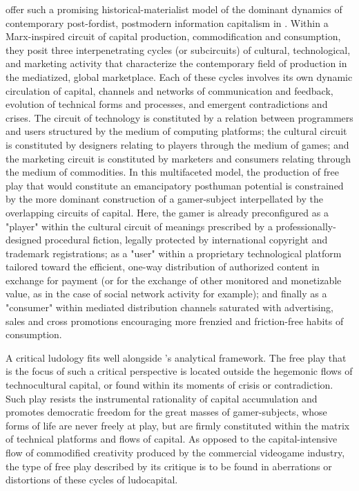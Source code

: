 \citeauthor{Kline2003} offer such a promising historical-materialist model of the dominant dynamics of contemporary post-fordist, postmodern information capitalism in . Within a Marx-inspired circuit of capital production, commodification and consumption, they posit three interpenetrating cycles (or subcircuits) of cultural, technological, and marketing activity that characterize the contemporary field of production in the mediatized, global marketplace. Each of these cycles involves its own dynamic circulation of capital, channels and networks of communication and feedback, evolution of technical forms and processes, and emergent contradictions and crises. The circuit of technology is constituted by a relation between programmers and users structured by the medium of computing platforms; the cultural circuit is constituted by designers relating to players through the medium of games; and the marketing circuit is constituted by marketers and consumers relating through the medium of commodities. In this multifaceted model, the production of free play that would constitute an emancipatory posthuman potential is constrained by the more dominant construction of a gamer-subject interpellated by the overlapping circuits of capital. Here, the gamer is already preconfigured as a "player" within the cultural circuit of meanings prescribed by a professionally-designed procedural fiction, legally protected by international copyright and trademark registrations; as a "user" within a proprietary technological platform tailored toward the efficient, one-way distribution of authorized content in exchange for payment (or for the exchange of other monitored and monetizable value, as in the case of social network activity for example); and finally as a "consumer" within mediated distribution channels saturated with advertising, sales and cross promotions encouraging more frenzied and friction-free habits of consumption.

A critical ludology fits well alongside \citeauthor{Kline2003}'s analytical framework. The free play that is the focus of such a critical perspective is located outside the hegemonic flows of technocultural capital, or found within its moments of crisis or contradiction. Such play resists the instrumental rationality of capital accumulation and promotes democratic freedom for the great masses of gamer-subjects, whose forms of life are never freely at play, but are firmly constituted within the matrix of technical platforms and flows of capital. As opposed to the capital-intensive flow of commodified creativity produced by the commercial videogame industry, the type of free play described by its critique is to be found in aberrations or distortions of these cycles of ludocapital.

